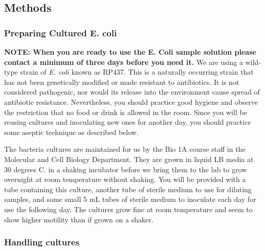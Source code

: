 \documentclass{../lab}
\begin{document}


\subsection{Methods}

\subsubsection{Preparing Cultured E. coli}

\textbf{NOTE: When you are ready to use the E. Coli sample solution please contact \LabEngineer a minimum of three days before you need it.} We are using a wild-type strain of \emph{E. coli} known as RP437. This is a naturally occurring strain that has not been genetically modified or made resistant to antibiotics. It is not considered pathogenic, nor would its release into the environment cause spread of antibiotic resistance. Nevertheless, you should practice good hygiene and observe the restriction that no food or drink is allowed in the room. Since you will be reusing cultures and inoculating new ones for another day, you should practice some aseptic technique as described below.

The bacteria cultures are maintained for us by the Bio 1A course staff in the Molecular and Cell Biology Department. They are grown in liquid LB media at 30 degrees C. in a shaking incubator before we bring them to the lab to grow overnight at room temperature without shaking. You will be provided with a tube containing this culture, another tube of sterile medium to use for diluting samples, and some small 5 mL tubes of sterile medium to inoculate each day for use the following day. The cultures grow fine at room temperature and seem to show higher motility than if grown on a shaker.

\subsubsection{Handling cultures}
\end{document}
